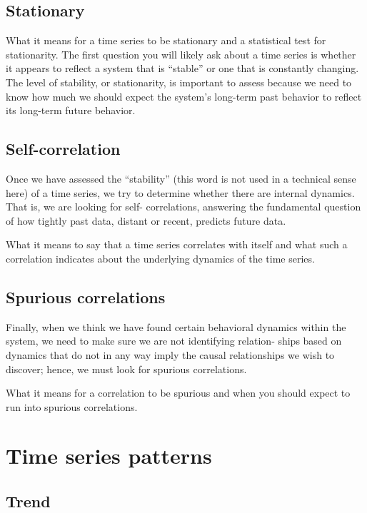 \documentclass[openany]{book}
\begin{document}
\subsection{Stationary}

What it means for a time series to be stationary and a statistical test for stationarity. The first question you will likely ask about a time series is whether it appears to reflect a system that is “stable” or one that is constantly changing. The level of stability, or stationarity, is important to assess because we need to know how much we should expect the system’s long-term past behavior to reflect its long-term future behavior. 

\subsection{Self-correlation}

Once we have assessed the “stability” (this word is not used in a technical sense here) of a time series, we try to determine whether there are internal dynamics. That is, we are looking for self- correlations, answering the fundamental question of how tightly past data, distant or recent, predicts future data. 


What it means to say that a time series correlates with itself and what such a correlation indicates about the underlying dynamics of the time series.  

\subsection{Spurious correlations}

Finally, when we think we have found certain behavioral dynamics within the system, we need to make sure we are not identifying relation‐ ships based on dynamics that do not in any way imply the causal relationships we wish to discover; hence, we must look for spurious correlations.

What it means for a correlation to be spurious and when you should expect to run into spurious correlations. 




\section{Time series patterns}

\subsection{Trend}
\end{document}
